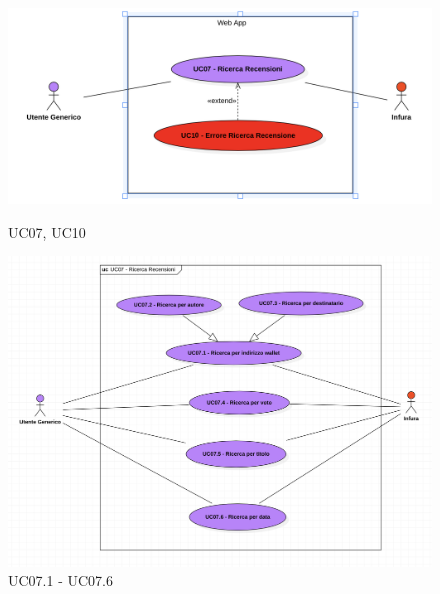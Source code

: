             \begin{figure}[H]
                \centering
                \includegraphics[scale=0.6]{src/img/UC07.png}
                \caption{UC07, UC10}
                \includegraphics[scale=0.4]{src/img/UC07.x.png}
                \caption{UC07.1 - UC07.6}
            \end{figure}

